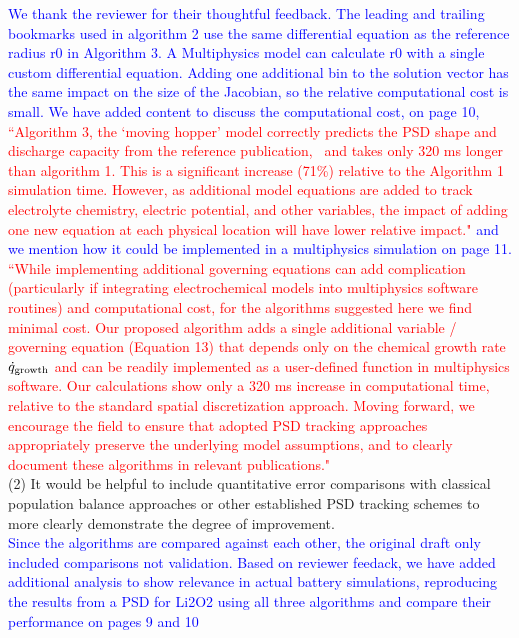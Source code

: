 \documentclass[12 pt]{article}    %
\begin{document}
\noindent\textcolor{blue}{We thank the reviewer for their thoughtful feedback. The leading and trailing bookmarks used in algorithm 2 use the same differential equation as the reference radius r0 in Algorithm 3. A Multiphysics model can calculate r0 with a single custom differential equation. Adding one additional bin to the solution vector has the same impact on the size of the Jacobian, so the relative computational cost is small. We have added content to discuss the computational cost, on page 10,} \textcolor{red}{ ``Algorithm 3, the `moving hopper' model correctly predicts the PSD shape and discharge capacity from the reference publication,~\cite{bib:Verify} and takes only 320 ms longer than algorithm 1. This is a significant increase (71\%) relative to the Algorithm 1 simulation time. However, as additional model equations are added to track electrolyte chemistry, electric potential, and other  variables, the impact of adding one new equation at each physical location will have lower relative impact."} \textcolor{blue}{and we mention how it could be implemented in a multiphysics simulation on page 11.} 
\textcolor{red}{``While implementing additional governing equations can add complication (particularly if integrating electrochemical models into multiphysics software routines) and computational cost, for the algorithms suggested here we find minimal cost. Our proposed algorithm adds a single additional variable / governing equation (Equation 13) that depends only on the chemical growth rate $\dot{q}_{\rm growth}$ and can be readily implemented as a user-defined function in multiphysics software. Our calculations show only a 320 ms increase in computational time, relative to the standard spatial discretization approach.  Moving forward, we encourage the field to ensure that adopted PSD tracking approaches appropriately preserve the underlying model assumptions, and to clearly document these algorithms in relevant publications."} \\


\noindent (2) It would be helpful to include quantitative error comparisons with classical population balance approaches or other established PSD tracking schemes to more clearly demonstrate the degree of improvement. \\

\noindent\textcolor{blue}{Since the algorithms are compared against each other, the original draft only included comparisons not validation. Based on reviewer feedack, we have added additional analysis to show relevance in actual battery simulations, reproducing the results from a PSD for Li2O2 \cite{bib:Verify} using all three algorithms and compare their performance on pages 9 and 10}  \\ 
\end{document}

